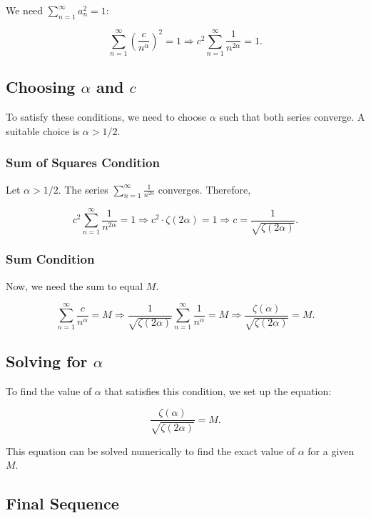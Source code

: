 \documentclass[a4 paper]{article}
\theoremstyle{boldStyle}
\theoremstyle{boldBlueStyle}
\theoremstyle{boldPurpleStyle}
\theoremstyle{boldRedStyle}
\begin{document}
\begin{enumerate}
We need \(\sum_{n=1}^{\infty} a_n^2 = 1\):

\[
\sum_{n=1}^{\infty} \left(\frac{c}{n^\alpha}\right)^2 = 1 \Rightarrow c^2 \sum_{n=1}^{\infty} \frac{1}{n^{2\alpha}} = 1.
\]

\subsection*{Choosing \(\alpha\) and \(c\)}

To satisfy these conditions, we need to choose \(\alpha\) such that both series converge. A suitable choice is \(\alpha > 1/2\).

\subsubsection*{Sum of Squares Condition}

Let \(\alpha > 1/2\). The series \(\sum_{n=1}^{\infty} \frac{1}{n^{2\alpha}}\) converges. Therefore,

\[
c^2 \sum_{n=1}^{\infty} \frac{1}{n^{2\alpha}} = 1 \Rightarrow c^2 \cdot \zeta(2\alpha) = 1 \Rightarrow c = \frac{1}{\sqrt{\zeta(2\alpha)}}.
\]

\subsubsection*{Sum Condition}

Now, we need the sum to equal \(M\).

\[
\sum_{n=1}^{\infty} \frac{c}{n^\alpha} = M \Rightarrow \frac{1}{\sqrt{\zeta(2\alpha)}} \sum_{n=1}^{\infty} \frac{1}{n^\alpha} = M \Rightarrow \frac{\zeta(\alpha)}{\sqrt{\zeta(2\alpha)}} = M.
\]

\subsection*{Solving for \(\alpha\)}

To find the value of \(\alpha\) that satisfies this condition, we set up the equation:

\[
\frac{\zeta(\alpha)}{\sqrt{\zeta(2\alpha)}} = M.
\]

This equation can be solved numerically to find the exact value of \(\alpha\) for a given \(M\).

\subsection*{Final Sequence}


\end{enumerate}
\end{document}
